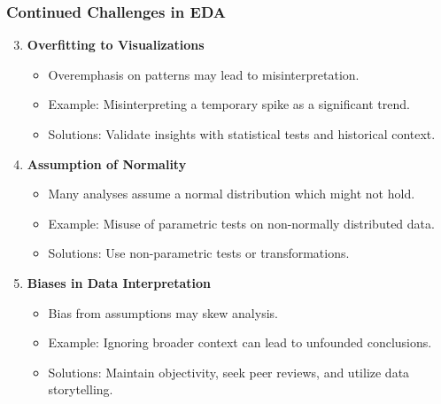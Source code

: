 \documentclass[aspectratio=169]{beamer}
\begin{document}
\begin{frame}[fragile]
    \frametitle{Continued Challenges in EDA}
    \begin{enumerate}
        \setcounter{enumi}{2}
        \item \textbf{Overfitting to Visualizations}  
        \begin{itemize}
            \item Overemphasis on patterns may lead to misinterpretation. 
            \item Example: Misinterpreting a temporary spike as a significant trend.
            \item Solutions: Validate insights with statistical tests and historical context.
        \end{itemize}
        
        \item \textbf{Assumption of Normality}  
        \begin{itemize}
            \item Many analyses assume a normal distribution which might not hold.
            \item Example: Misuse of parametric tests on non-normally distributed data.
            \item Solutions: Use non-parametric tests or transformations.
        \end{itemize}
        
        \item \textbf{Biases in Data Interpretation}  
        \begin{itemize}
            \item Bias from assumptions may skew analysis. 
            \item Example: Ignoring broader context can lead to unfounded conclusions.
            \item Solutions: Maintain objectivity, seek peer reviews, and utilize data storytelling.
        \end{itemize}
    \end{enumerate}
\end{frame}
\end{document}
